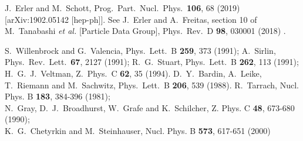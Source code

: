 \documentclass[Physsubmission, Phys]{SciPost}
\begin{document}
\begin{thebibliography}{100}
  J.~Erler and M.~Schott,
  Prog.\ Part.\ Nucl.\ Phys.\  {\bf 106}, 68 (2019)
  [arXiv:1902.05142 [hep-ph]].
  See J.~Erler and A.~Freitas, section 10 of
  M.~Tanabashi {\it et al.} [Particle Data Group],
  Phys.\ Rev.\ D {\bf 98}, 030001 (2018) .

  S.~Willenbrock and G.~Valencia,
  Phys.\ Lett.\ B {\bf 259}, 373 (1991); %
  A.~Sirlin,
  Phys.\ Rev.\ Lett.\  {\bf 67}, 2127 (1991); %
  R.~G.~Stuart,
  Phys.\ Lett.\ B {\bf 262}, 113 (1991); %
  H.~G.~J.~Veltman,
  Z.\ Phys.\ C {\bf 62}, 35 (1994).
  D.~Y.~Bardin, A.~Leike, T.~Riemann and M.~Sachwitz,
  Phys.\ Lett.\ B {\bf 206}, 539 (1988).
R.~Tarrach,
Nucl. Phys. B \textbf{183}, 384-396 (1981);\\
N.~Gray, D.~J.~Broadhurst, W.~Grafe and K.~Schilcher,
Z. Phys. C \textbf{48}, 673-680 (1990);\\
K.~G.~Chetyrkin and M.~Steinhauser,
Nucl. Phys. B \textbf{573}, 617-651 (2000)

\end{thebibliography}
\end{document}
